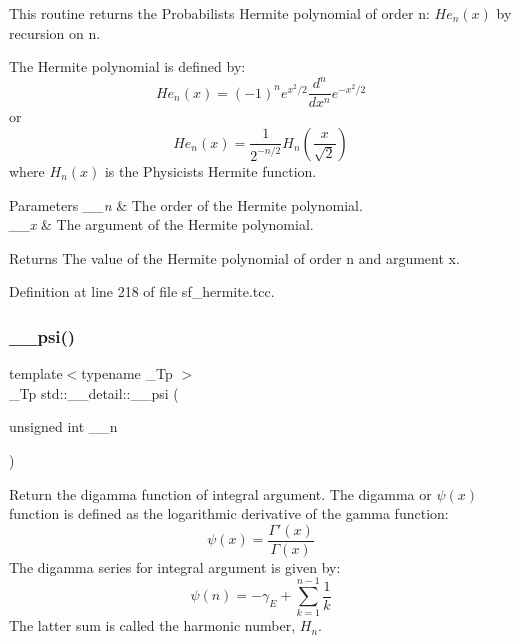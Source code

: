 This routine returns the Probabilists Hermite polynomial of order n\+: $ He_n(x) $ by recursion on n. 

The Hermite polynomial is defined by\+: \[ He_n(x) = (-1)^n e^{x^2/2} \frac{d^n}{dx^n} e^{-x^2/2} \] or \[ He_n(x) = \frac{1}{2^{-n/2}}H_n\left(\frac{x}{\sqrt{2}}\right) \] where $ H_n(x) $ is the Physicists Hermite function.


\begin{DoxyParams}{Parameters}
{\em \+\_\+\+\_\+n} & The order of the Hermite polynomial. \\
\hline
{\em \+\_\+\+\_\+x} & The argument of the Hermite polynomial. \\
\hline
\end{DoxyParams}
\begin{DoxyReturn}{Returns}
The value of the Hermite polynomial of order n and argument x. 
\end{DoxyReturn}


Definition at line 218 of file sf\+\_\+hermite.\+tcc.

\mbox{\label{namespacestd_1_1____detail_a664d83a211283d0975ba40f3874c2d70}} 
\subsubsection{\texorpdfstring{\+\_\+\+\_\+psi()}{\_\_psi()}\hspace{0.1cm}{\footnotesize\ttfamily [1/3]}}
{\footnotesize\ttfamily template$<$typename \+\_\+\+Tp $>$ \\
\+\_\+\+Tp std\+::\+\_\+\+\_\+detail\+::\+\_\+\+\_\+psi (\begin{DoxyParamCaption}\item[{unsigned int}]{\+\_\+\+\_\+n }\end{DoxyParamCaption})}



Return the digamma function of integral argument. The digamma or $ \psi(x) $ function is defined as the logarithmic derivative of the gamma function\+: \[ \psi(x) = \frac{\Gamma'(x)}{\Gamma(x)} \] The digamma series for integral argument is given by\+: \[ \psi(n) = -\gamma_E + \sum_{k=1}^{n-1} \frac{1}{k} \] The latter sum is called the harmonic number, $ H_n $. 



